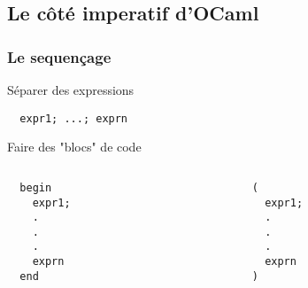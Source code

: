 \subsection{Le côté imperatif d'OCaml} %

\begin{frame}[fragile]
	\frametitle{Le sequençage}
		\begin{block}{Séparer des expressions}
			\begin{lstlisting}
  expr1; ...; exprn
			\end{lstlisting}
		\end{block}
		\begin{block}{Faire des "blocs" de code}
			\begin{columns}
				\begin{column}{3cm}
					\begin{lstlisting}
  begin
    expr1;
    .
    .
    .
    exprn
  end
					\end{lstlisting}
				\end{column}
				\begin{column}{7cm}
					\begin{lstlisting}
  (
    expr1;
    .
    .
    .
    exprn
  )
					\end{lstlisting}
				\end{column}
			\end{columns}
		\end{block}
\end{frame}

